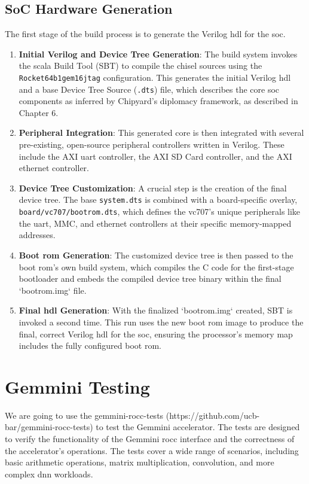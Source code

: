 \subsection{SoC Hardware Generation}
The first stage of the build process is to generate the Verilog \acrshort{hdl} for the \acrshort{soc}. 
\begin{enumerate}
    \item \textbf{Initial Verilog and Device Tree Generation}: The build system invokes the \acrshort{scala} Build Tool (SBT) to compile the \acrshort{chisel} sources using the \texttt{Rocket\allowbreak 64b1gem16jtag} configuration. This generates the initial Verilog \acrshort{hdl} and a base Device Tree Source (\texttt{.dts}) file, which describes the core \acrshort{soc} components as inferred by Chipyard's diplomacy framework, as described in Chapter 6.
    \item \textbf{Peripheral Integration}: This generated core is then integrated with several pre-existing, open-source peripheral controllers written in Verilog. These include the AXI \acrshort{uart} controller, the AXI SD Card controller, and the AXI \acrshort{ethernet} controller.
    \item \textbf{Device Tree Customization}: A crucial step is the creation of the final device tree. The base \texttt{system.dts} is combined with a board-specific overlay, \texttt{board/vc707/bootrom.dts}, which defines the \acrshort{vc707}'s unique peripherals like the \acrshort{uart}, MMC, and \acrshort{ethernet} controllers at their specific memory-mapped addresses.
    \item \textbf{Boot \acrshort{rom} Generation}: The customized device tree is then passed to the boot \acrshort{rom}'s own build system, which compiles the C code for the first-stage bootloader and embeds the compiled device tree binary within the final `bootrom.img` file.
    \item \textbf{Final \acrshort{hdl} Generation}: With the finalized `bootrom.img` created, SBT is invoked a second time. This run uses the new boot \acrshort{rom} image to produce the final, correct Verilog \acrshort{hdl} for the \acrshort{soc}, ensuring the processor's memory map includes the fully configured boot \acrshort{rom}.
\end{enumerate}

\section{Gemmini Testing}
We are going to use the gemmini-rocc-tests (https://github.com/ucb-bar/gemmini-rocc-tests) to test the Gemmini accelerator. The tests are designed to verify the functionality of the Gemmini \acrshort{rocc} interface and the correctness of the accelerator's operations. The tests cover a wide range of scenarios, including basic arithmetic operations, matrix multiplication, convolution, and more complex \acrshort{dnn} workloads.

